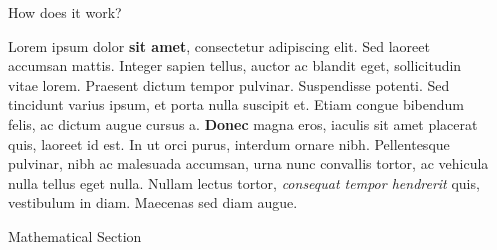 \documentclass[final]{beamer}
\newlength{\sepwid}
\newlength{\onecolwid}
\begin{document}
\begin{frame}[t]
\begin{columns}[t]
\begin{column}{\sepwid}
\end{column} %


\begin{column}{\onecolwid} %


\begin{block}{How does it work?}

Lorem ipsum dolor \textbf{sit amet}, consectetur adipiscing elit. Sed laoreet accumsan mattis. Integer sapien tellus, auctor ac blandit eget, sollicitudin vitae lorem. Praesent dictum tempor pulvinar. Suspendisse potenti. Sed tincidunt varius ipsum, et porta nulla suscipit et. Etiam congue bibendum felis, ac dictum augue cursus a. \textbf{Donec} magna eros, iaculis sit amet placerat quis, laoreet id est. In ut orci purus, interdum ornare nibh. Pellentesque pulvinar, nibh ac malesuada accumsan, urna nunc convallis tortor, ac vehicula nulla tellus eget nulla. Nullam lectus tortor, \textit{consequat tempor hendrerit} quis, vestibulum in diam. Maecenas sed diam augue.

\end{block}


%


%
%
%
\begin{block}{Mathematical Section}


\end{block}
\end{column}
\end{columns}
\end{frame}
\end{document}
